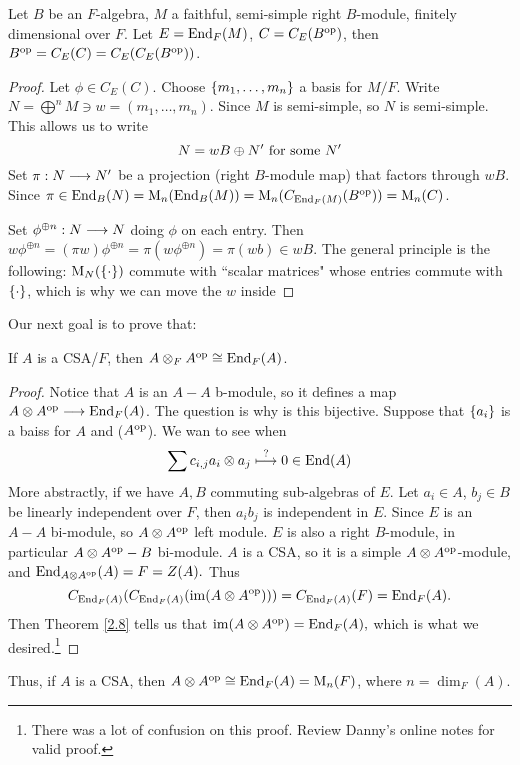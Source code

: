 \begin{theorem}\label{2.8}
Let $B$ be an $F$-algebra, $M$ a faithful, semi-simple right $B$-module, finitely dimensional over $F$. Let $E = \operatorname{End}_F(M)$, $C = C_E(B^{\operatorname{op}})$, then $B^{\operatorname{op}} = C_E(C) = C_E(C_E(B^{\operatorname{op}}))$.
\end{theorem}
\begin{proof}
Let $\phi \in C_E(C)$. Choose $\left\lbrace m_1,\dots , m_n \right\rbrace$ a basis for $M/F$. Write $N = \bigoplus^n M \ni w = (m_1,\dots , m_n)$. Since $M$ is semi-simple, so $N$ is semi-simple. This allows us to write
$$N = wB \oplus N' \text{ for some } N'$$
Set $\pi : N\longrightarrow N'$ be a projection (right $B$-module map) that factors through $wB$. Since $\pi \in \operatorname{End}_B(N) = \operatorname{M}_n(\operatorname{End}_B(M)) = \operatorname{M}_n(C_{\operatorname{End}_F(M)}(B^{\operatorname{op}})) = \operatorname{M}_n(C)$. 

Set $\phi^{\oplus n}: N \longrightarrow N$ doing $\phi$ on each entry. Then $w\phi^{\oplus n} = (\pi w)\phi^{\oplus n} = \pi (w\phi^{\oplus n}) = \pi(wb) \in wB$. The general principle is the following:
$\operatorname{M}_N(\left\lbrace \cdot \right\rbrace)$ commute with ``scalar matrices" whose entries commute with $\left\lbrace \cdot \right\rbrace$, which is why we can move the $w$ inside
\end{proof}
Our next goal is to prove that:
\begin{theorem}\label{2.9}
If $A$ is a CSA/$F$, then $A \otimes_F A^{\operatorname{op}} \cong \operatorname{End}_F(A)$.
\end{theorem}
\begin{proof}
Notice that $A$ is an $A-A$ b-module, so it defines a map $A\otimes A^{\operatorname{op}} \longrightarrow \operatorname{End}_F(A)$. The question is why is this bijective. Suppose that $\left\lbrace a_i \right\rbrace$ is a baiss for $A$ and ($A^{\operatorname{op}}$). We wan to see when 
$$\sum c_{i,j}a_i \otimes a_j \overset{?}{\longmapsto} 0 \in \operatorname{End} (A)$$
More abstractly, if we have $A,B$ commuting sub-algebras of $E$. Let $a_i \in A$, $b_j \in B$ be linearly independent over $F$, then $a_ib_j$ is independent in $E$. Since $E$ is an $A-A$ bi-module, so $A \otimes A^{\operatorname{op}}$ left module. $E$ is also a right $B$-module, in particular $A\otimes A^{\operatorname{op}} - B$ bi-module. $A$ is a CSA, so it is a simple $A\otimes A^{\operatorname{op}}$-module, and $\operatorname{End}_{A\otimes A^{\operatorname{op}}}(A) = F = Z(A).$ Thus 
$$C_{\operatorname{End}_F(A)}(C_{\operatorname{End}_F(A)}(\operatorname{im}(A\otimes A^{\operatorname{op}}))) = C_{\operatorname{End}_F(A)}(F) = \operatorname{End}_F(A).$$
Then Theorem \ref{2.8} tells us that $\operatorname{im} (A\otimes A^{\operatorname{op}}) = \operatorname{End}_F(A),$ which is what we desired.\footnote{There was a lot of confusion on this proof. Review Danny's online notes for valid proof.} 
\end{proof}

Thus, if $A$ is a CSA, then $A \otimes A^{\operatorname{op}} \cong \operatorname{End}_F(A) = \operatorname{M}_n(F)$, where $n = \dim_F(A)$. 

